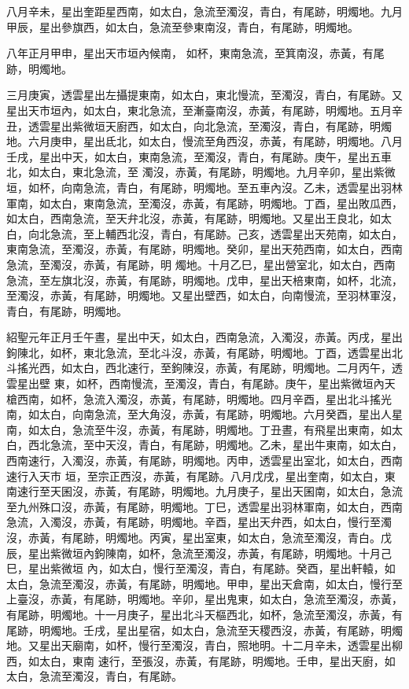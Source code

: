 \begin{pinyinscope}
 八月辛未，星出奎距星西南，如太白，急流至濁沒，青白，有尾跡，明燭地。九月甲辰，星出參旗西，如太白，急流至參東南沒，青白，有尾跡，明燭地。



 八年正月甲申，星出天市垣內候南，
 如杯，東南急流，至箕南沒，赤黃，有尾跡，明燭地。



 三月庚寅，透雲星出左攝提東南，如太白，東北慢流，至濁沒，青白，有尾跡。又星出天市垣內，如太白，東北急流，至漸臺南沒，赤黃，有尾跡，明燭地。五月辛丑，透雲星出紫微垣天廚西，如太白，向北急流，至濁沒，青白，有尾跡，明燭地。六月庚申，星出氐北，如太白，慢流至角西沒，赤黃，有尾跡，明燭地。八月壬戌，星出中天，如太白，東南急流，至濁沒，青白，有尾跡。庚午，星出五車北，如太白，東北急流，至
 濁沒，赤黃，有尾跡，明燭地。九月辛卯，星出紫微垣，如杯，向南急流，青白，有尾跡，明燭地。至五車內沒。乙未，透雲星出羽林軍南，如太白，東南急流，至濁沒，赤黃，有尾跡，明燭地。丁酉，星出敗瓜西，如太白，西南急流，至天弁北沒，赤黃，有尾跡，明燭地。又星出王良北，如太白，向北急流，至上輔西北沒，青白，有尾跡。己亥，透雲星出天苑南，如太白，東南急流，至濁沒，赤黃，有尾跡，明燭地。癸卯，星出天苑西南，如太白，西南急流，至濁沒，赤黃，有尾跡，明
 燭地。十月乙巳，星出營室北，如太白，西南急流，至左旗北沒，赤黃，有尾跡，明燭地。戊申，星出天棓東南，如杯，北流，至濁沒，赤黃，有尾跡，明燭地。又星出壁西，如太白，向南慢流，至羽林軍沒，青白，有尾跡，明燭地。



 紹聖元年正月壬午晝，星出中天，如太白，西南急流，入濁沒，赤黃。丙戌，星出鉤陳北，如杯，東北急流，至北斗沒，赤黃，有尾跡，明燭地。丁酉，透雲星出北斗搖光西，如太白，西北速行，至鉤陳沒，赤黃，有尾跡，明燭地。二月丙午，透雲星出壁
 東，如杯，西南慢流，至濁沒，青白，有尾跡。庚午，星出紫微垣內天槍西南，如杯，急流入濁沒，赤黃，有尾跡，明燭地。四月辛酉，星出北斗搖光南，如太白，向南急流，至大角沒，赤黃，有尾跡，明燭地。六月癸酉，星出人星南，如太白，急流至牛沒，赤黃，有尾跡，明燭地。丁丑晝，有飛星出東南，如太白，西北急流，至中天沒，青白，有尾跡，明燭地。乙未，星出牛東南，如太白，西南速行，入濁沒，赤黃，有尾跡，明燭地。丙申，透雲星出室北，如太白，西南速行入天市
 垣，至宗正西沒，赤黃，有尾跡。八月戊戌，星出奎南，如太白，東南速行至天囷沒，赤黃，有尾跡，明燭地。九月庚子，星出天囷南，如太白，急流至九州殊口沒，赤黃，有尾跡，明燭地。丁巳，透雲星出羽林軍南，如太白，西南急流，入濁沒，赤黃，有尾跡，明燭地。辛酉，星出天弁西，如太白，慢行至濁沒，赤黃，有尾跡，明燭地。丙寅，星出室東，如太白，急流至濁沒，青白。戊辰，星出紫微垣內鉤陳南，如杯，急流至濁沒，赤黃，有尾跡，明燭地。十月己巳，星出紫微垣
 內，如太白，慢行至濁沒，青白，有尾跡。癸酉，星出軒轅，如太白，急流至濁沒，赤黃，有尾跡，明燭地。甲申，星出天倉南，如太白，慢行至上臺沒，赤黃，有尾跡，明燭地。辛卯，星出鬼東，如太白，急流至濁沒，赤黃，有尾跡，明燭地。十一月庚子，星出北斗天樞西北，如杯，急流至濁沒，赤黃，有尾跡，明燭地。壬戌，星出星宿，如太白，急流至天稷西沒，赤黃，有尾跡，明燭地。又星出天廟南，如杯，慢行至濁沒，青白，照地明。十二月辛未，透雲星出柳西，如太白，東南
 速行，至張沒，赤黃，有尾跡，明燭地。壬申，星出天廚，如太白，急流至濁沒，青白，有尾跡。




\end{pinyinscope}
